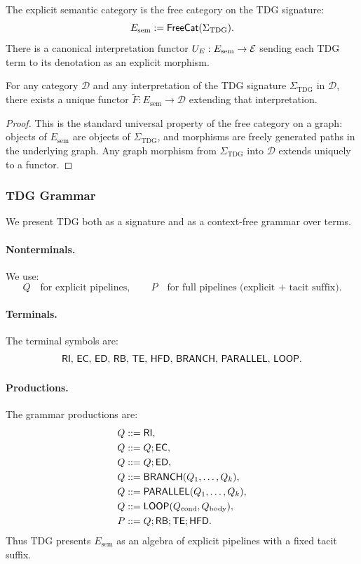 \begin{definition}
The explicit semantic category is the free category on the TDG signature:
\[
E_{\mathrm{sem}} := \mathsf{FreeCat}(\Sigma_{\mathrm{TDG}}).
\]
There is a canonical interpretation functor
\(U_E : E_{\mathrm{sem}} \to \mathcal{E}\)
sending each TDG term to its denotation as an explicit morphism.
\end{definition}

\begin{theorem}
\label{thm:free-explicit-algebra}
For any category \(\mathcal{D}\) and any interpretation of the TDG signature
\(\Sigma_{\mathrm{TDG}}\) in \(\mathcal{D}\), there exists a unique functor
\(\tilde{F} : E_{\mathrm{sem}} \to \mathcal{D}\) extending that interpretation.
\end{theorem}

\begin{proof}
This is the standard universal property of the free category on a graph:
objects of \(E_{\mathrm{sem}}\) are objects of \(\Sigma_{\mathrm{TDG}}\), and morphisms
are freely generated paths in the underlying graph. Any graph morphism
from \(\Sigma_{\mathrm{TDG}}\) into \(\mathcal{D}\) extends uniquely to a functor.
\end{proof}

\subsubsection{TDG Grammar}

We present TDG both as a signature and as a context-free grammar
over terms.

\paragraph{Nonterminals.}
We use:
\[
Q \quad\text{for explicit pipelines}, \qquad
P \quad\text{for full pipelines (explicit + tacit suffix)}.
\]

\paragraph{Terminals.}
The terminal symbols are:
\[
\mathsf{RI},\, \mathsf{EC},\, \mathsf{ED},\, \mathsf{RB},\, \mathsf{TE},\, \mathsf{HFD},\,
\mathsf{BRANCH},\, \mathsf{PARALLEL},\, \mathsf{LOOP}.
\]

\paragraph{Productions.}
The grammar productions are:
\begin{align*}
Q &::= \mathsf{RI},\\
Q &::= Q;\mathsf{EC},\\
Q &::= Q;\mathsf{ED},\\
Q &::= \mathsf{BRANCH}(Q_1,\dots,Q_k),\\
Q &::= \mathsf{PARALLEL}(Q_1,\dots,Q_k),\\
Q &::= \mathsf{LOOP}(Q_{\mathrm{cond}}, Q_{\mathrm{body}}),\\
P &::= Q;\mathsf{RB};\mathsf{TE};\mathsf{HFD}.
\end{align*}
Thus TDG presents \(E_{\mathrm{sem}}\) as an algebra of explicit pipelines
with a fixed tacit suffix.

